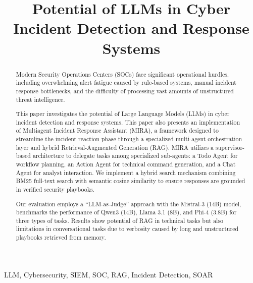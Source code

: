 \documentclass[conference]{IEEEtran}
\begin{document}
\title{Potential of LLMs in Cyber Incident Detection and Response Systems}

\author{
}

\maketitle
\begin{abstract}
Modern Security Operations Centers (SOCs) face significant operational hurdles, including overwhelming alert fatigue caused by rule-based systems, manual incident response bottlenecks, and the difficulty of processing vast amounts of unstructured threat intelligence. 

This paper investigates the potential of Large Language Models (LLMs) in cyber incident detection and response systems.
This paper also presents an implementation of Multiagent Incident Response Assistant (MIRA), 
a framework designed to streamline the incident reaction phase through a specialized multi-agent orchestration layer and hybrid Retrieval-Augmented Generation (RAG). 
MIRA utilizes a supervisor-based architecture to delegate tasks among specialized sub-agents: a Todo Agent for workflow planning, an Action Agent for technical command generation, and a Chat Agent for analyst interaction. 
We implement a hybrid search mechanism combining BM25 full-text search with semantic cosine similarity to ensure responses are grounded in verified security playbooks. 

Our evaluation employs a ``LLM-as-Judge'' approach with the Mistral-3 (14B) model, benchmarks the performance of Qwen3 (14B), Llama 3.1 (8B), and Phi-4 (3.8B) for three types of tasks. 
Results show potential of RAG in technical tasks but also limitations in conversational tasks due to verbosity caused by long and unstructured playbooks retrieved from memory.   
\end{abstract}

\begin{IEEEkeywords}
LLM, Cybersecurity, SIEM, SOC, RAG, Incident Detection, SOAR
\end{IEEEkeywords}
\end{document}
